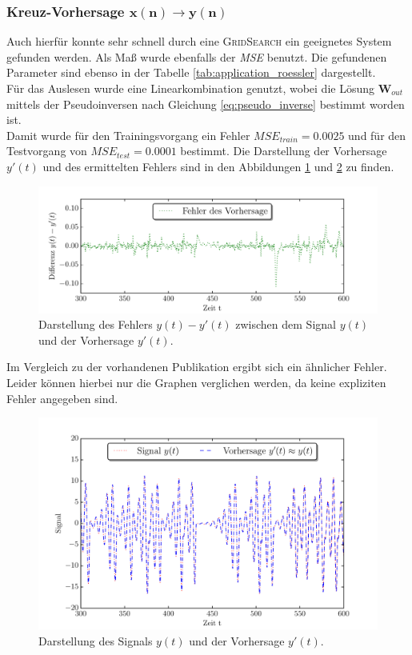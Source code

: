 \subsubsection[Kreuz-Vorhersage $x(n) \rightarrow y(n)$]{Kreuz-Vorhersage $\pmb{x(n) \rightarrow y(n)}$}
Auch hierfür konnte sehr schnell durch eine \textsc{GridSearch} ein geeignetes System gefunden werden. Als Maß wurde ebenfalls der \textit{MSE} benutzt. Die gefundenen Parameter sind ebenso in der Tabelle \ref{tab:application_roessler} dargestellt.\\
Für das Auslesen wurde eine Linearkombination genutzt, wobei die Lösung $\mathbf{W}_{out}$ mittels der Pseudoinversen nach Gleichung \ref{eq:pseudo_inverse} bestimmt worden ist.\\

Damit wurde für den Trainingsvorgang ein Fehler $MSE_{train} = 0.0025$ und für den Testvorgang von $MSE_{test} = 0.0001$ bestimmt. Die Darstellung der Vorhersage $y'(t)$ und des ermittelten Fehlers sind in den Abbildungen \ref{fig:application_roessler_b1} und \ref{fig:application_roessler_b2} zu finden.

\begin{figure}[H]
    \centering
     \includegraphics[width = 0.9 \textwidth]{figures/roessler_cross_err.pdf}
    \caption{Darstellung des Fehlers $y(t)-y'(t)$ zwischen dem Signal $y(t)$ und der Vorhersage $y'(t)$.}
    \label{fig:application_roessler_b1}
\end{figure}
 Im Vergleich zu der vorhandenen Publikation \cite{parlitz2005} ergibt sich ein ähnlicher Fehler. Leider können hierbei nur die Graphen verglichen werden, da keine expliziten Fehler angegeben sind.


\begin{figure}[H]
    \centering
     \includegraphics[width = 0.9 \textwidth]{figures/roessler_cross_pred.pdf}
      \caption{Darstellung des Signals $y(t)$ und der Vorhersage $y'(t)$.}
    \label{fig:application_roessler_b2}
\end{figure}

